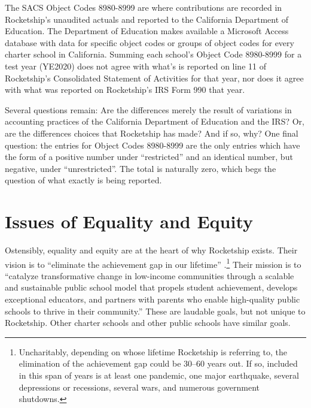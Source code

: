\begin{itemize}
  The SACS Object Codes 8980-8999 are where contributions are recorded in Rocketship's unaudited actuals and reported to the California Department of Education. The Department of Education makes available a Microsoft Access database with data for specific object codes or groups of object codes for every charter school in California. Summing each school's Object Code 8980-8999 for a test year (YE2020) does not agree with what's is reported on line 11 of Rocketship's Consolidated Statement of Activities for that year, nor does it agree with what was reported on Rocketship's IRS Form 990 that year.

  Several questions remain: Are the differences merely the result of variations in accounting practices of the California Department of Education and the IRS\@? Or, are the differences choices that Rocketship has made? And if so, why? One final question: the entries for Object Codes 8980-8999 are the only entries which have the form of a positive number under ``restricted'' and an identical number, but negative, under ``unrestricted''. The total is naturally zero, which begs the question of what exactly is being reported.

\end{itemize}

\section{Issues of Equality and Equity}%
\label{sec:issues_equality_equity}\indent%

Ostensibly, equality and equity are at the heart of why Rocketship exists. Their vision is to ``eliminate the achievement gap in our lifetime'' \parencite{RSE2017}.\footnote{Uncharitably, depending on whose lifetime Rocketship is referring to, the elimination of the achievement gap could be 30–60 years out. If so, included in this span of years is at least one pandemic, one major earthquake, several depressions or recessions, several wars, and numerous government shutdowns.} Their mission is to ``catalyze transformative change in low-income communities through a scalable and sustainable public school model that propels student achievement, develops exceptional educators, and partners with parents who enable high-quality public schools to thrive in their community.'' \parencite{RSE2017} These are laudable goals, but not unique to Rocketship. Other charter schools and other public schools have similar goals.

